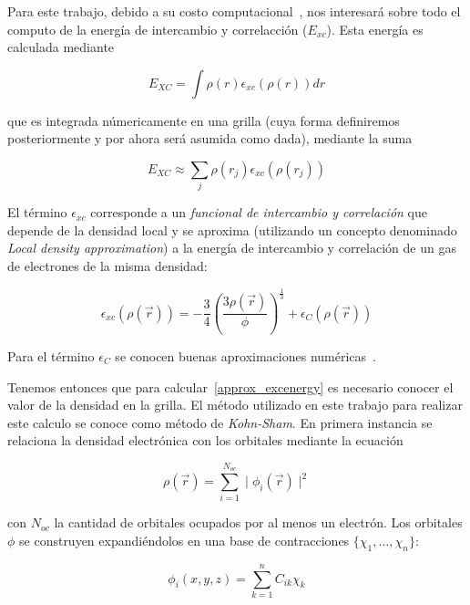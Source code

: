 Para este trabajo, debido a su costo computacional~\cite{PaperNitscheManu}, nos interesar\'a sobre todo el computo de la energ\'ia de intercambio y correlacci\'on ($E_{xc}$).
Esta energ\'ia es calculada mediante 

\begin{equation}
    E_{XC} = \int \rho(r) \epsilon_{xc}\left( \rho(r) \right ) dr
\end{equation}

que es integrada n\'umericamente en una grilla (cuya forma definiremos posteriormente y por ahora ser\'a asumida como dada), mediante la suma

\begin{equation}
    \label{approx_excenergy}
    E_{XC} \approx \sum_j \rho(r_j) \epsilon_{xc} (\rho(r_j))
\end{equation}

El t\'ermino $\epsilon_{xc}$ corresponde a un \textit{funcional de intercambio y correlaci\'on} que depende de la densidad local y
se aproxima (utilizando un concepto denominado \textit{Local density approximation}) a la energ\'ia de intercambio y correlaci\'on de 
un gas de electrones de la misma densidad:

\begin{equation}
    \epsilon_{xc}(\rho(\vec{r})) = -\frac{3}{4} \left (\frac{3 \rho(\vec{r})}{\phi} \right )^{\frac{1}{3}} + \epsilon_{C}(\rho(\vec{r}))
\end{equation}

Para el t\'ermino $\epsilon_{C}$ se conocen buenas aproximaciones num\'ericas~\cite{Vosko}.

Tenemos entonces que para calcular~\ref{approx_excenergy} es necesario conocer el valor de la densidad en la grilla.
El m\'etodo utilizado en este trabajo para realizar este calculo se conoce como m\'etodo de \textit{Kohn-Sham}. En primera instancia
se relaciona la densidad electr\'onica con los orbitales mediante la ecuaci\'on

\begin{equation}
    \rho(\vec{r}) = \sum_{i = 1}^{N_{oc}} \mid \phi_i(\vec{r}) \mid ^2
\end{equation}

con $N_{oc}$ la cantidad de orbitales ocupados por al menos un electr\'on. Los orbitales $\phi$ se construyen expandi\'endolos en una
base de contracciones $\{ \chi_1, \dots, \chi_n \}$:

\begin{equation}
    \phi_i(x,y,z) = \sum_{k = 1}^n C_{ik} \chi_k
\end{equation}


